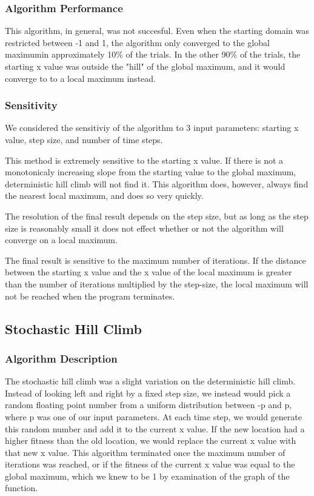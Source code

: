\subsubsection{Algorithm Performance}
This algorithm, in general, was not succesful. Even when the starting domain was restricted between -1 and 1, the algorithm only converged to the global maximumin  approximately 10\% of the trials. In the other 90\% of the trials, the starting x value was outside the "hill" of the global maximum, and it would converge to to a local maximum instead.

\subsubsection{Sensitivity}
We considered the sensitiviy of the algorithm to 3 input parameters: starting x value, step size, and number of time steps.

This method is extremely sensitive to the starting x value. If there is not a monotonicaly increasing slope from the starting value to the global maximum, deterministic hill climb will not find it. This algorithm does, however, always find the nearest local maximum, and does so very quickly.

The resolution of the final result depends on the step size, but as long as the step size is reasonably small it does not effect whether or not the algorithm will converge on a local maximum.

The final result is sensitive to the maximum number of iterations. If the distance between the starting x value and the x value of the local maximum is greater than the number of iterations multiplied by the step-size, the local maximum will not be reached when the program terminates.

\subsection{Stochastic Hill Climb}

\subsubsection{Algorithm Description}
The stochastic hill climb was a slight variation on the deterministic hill climb. Instead of looking left and right by a fixed step size, we instead would pick a random floating point number from a uniform distribution between -p and p, where p was one of our input parameters. At each time step, we would generate this random number and add it to the current x value. If the new location had a higher fitness than the old location, we would replace the current x value with that new x value. This algorithm terminated once the maximum number of iterations was reached, or if the fitness of the current x value was equal to the global maximum, which we knew to be 1 by examination of the graph of the function.

